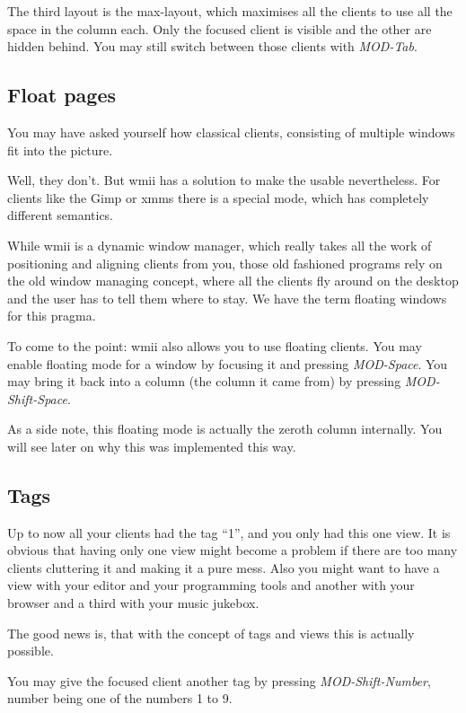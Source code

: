 \documentclass[12pt,a4paper]{article} %
\begin{document}
    The third layout is the max-layout, which maximises all the
    clients to use all the space in the column each. Only the focused
    client is visible and the other are hidden behind. You may still
    switch between those clients with \emph{MOD-Tab}.

  \subsection{Float pages}

    You may have asked yourself how classical clients, consisting of
    multiple windows fit into the picture.

    Well, they don't. But wmii has a solution to make the usable
    nevertheless. For clients like the Gimp or xmms there is a special
    mode, which has completely different semantics.

    While wmii is a dynamic window manager, which really takes all the
    work of positioning and aligning clients from you, those old
    fashioned programs rely on the old window managing concept, where
    all the clients fly around on the desktop and the user has to tell
    them where to stay. We have the term floating windows for this
    pragma.

    To come to the point: wmii also allows you to use floating
    clients. You may enable floating mode for a window by focusing it
    and pressing \emph{MOD-Space}. You may bring it back into a column
    (the column it came from) by pressing \emph{MOD-Shift-Space}.

    As a side note, this floating mode is actually the zeroth column
    internally. You will see later on why this was implemented this
    way.

  \subsection{Tags}

    Up to now all your clients had the tag ``1'', and you only had
    this one view. It is obvious that having only one view might
    become a problem if there are too many clients cluttering it and
    making it a pure mess. Also you might want to have a view with
    your editor and your programming tools and another with your
    browser and a third with your music jukebox.

    The good news is, that with the concept of tags and views this is
    actually possible.

    You may give the focused client another tag by pressing
    \emph{MOD-Shift-Number}, number being one of the numbers 1 to 9.
\end{document}
